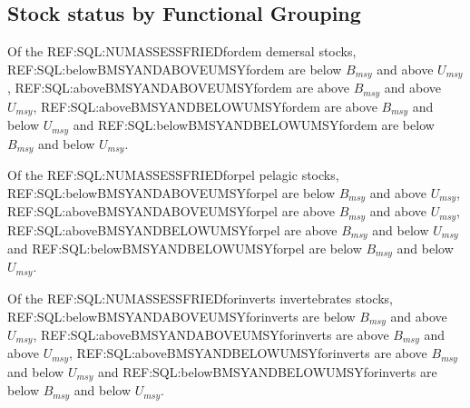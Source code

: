 \subsection*{Stock status by Functional Grouping}
Of the REF:SQL:NUMASSESSFRIEDfordem demersal stocks, REF:SQL:belowBMSYANDABOVEUMSYfordem are below $B_{msy}$ and above $U_{msy}$, REF:SQL:aboveBMSYANDABOVEUMSYfordem are above $B_{msy}$ and above $U_{msy}$, REF:SQL:aboveBMSYANDBELOWUMSYfordem are above $B_{msy}$ and below $U_{msy}$ and REF:SQL:belowBMSYANDBELOWUMSYfordem are below $B_{msy}$ and below $U_{msy}$.

Of the REF:SQL:NUMASSESSFRIEDforpel pelagic stocks, REF:SQL:belowBMSYANDABOVEUMSYforpel are below $B_{msy}$ and above $U_{msy}$, REF:SQL:aboveBMSYANDABOVEUMSYforpel are above $B_{msy}$ and above $U_{msy}$, REF:SQL:aboveBMSYANDBELOWUMSYforpel are above $B_{msy}$ and below $U_{msy}$ and REF:SQL:belowBMSYANDBELOWUMSYforpel are below $B_{msy}$ and below $U_{msy}$.

Of the REF:SQL:NUMASSESSFRIEDforinverts invertebrates stocks, REF:SQL:belowBMSYANDABOVEUMSYforinverts are below $B_{msy}$ and above $U_{msy}$, REF:SQL:aboveBMSYANDABOVEUMSYforinverts are above $B_{msy}$ and above $U_{msy}$, REF:SQL:aboveBMSYANDBELOWUMSYforinverts are above $B_{msy}$ and below $U_{msy}$ and REF:SQL:belowBMSYANDBELOWUMSYforinverts are below $B_{msy}$ and below $U_{msy}$.
